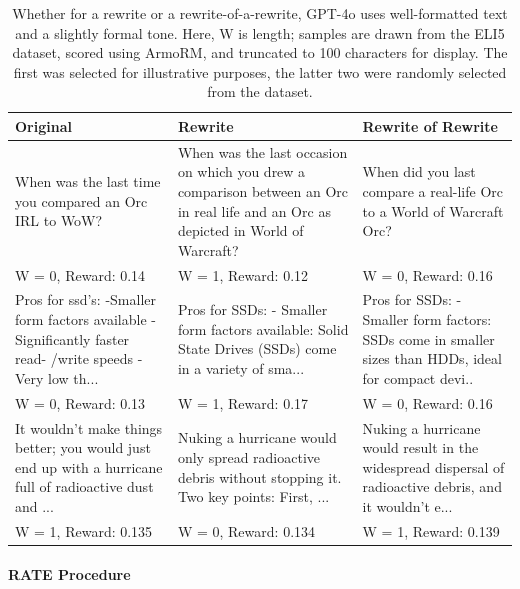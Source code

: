 \documentclass{article}
\begin{document}
\begin{table}[t]
  \centering
  \small
  \renewcommand{\arraystretch}{1.25}
  \begin{tabular}{|p{4cm}|p{4cm}|p{4cm}|}
  \hline
  \textbf{Original} & \textbf{Rewrite} & \textbf{Rewrite of Rewrite} \\
  \hline
  When was the last time you compared an Orc IRL to WoW? & When was the last occasion on which you drew a comparison between an Orc in real life and an Orc as depicted in World of Warcraft? & When did you last compare a real-life Orc to a World of Warcraft Orc? \\
  \hline
  W = 0, Reward: 0.14 & W = 1, Reward: 0.12 & W = 0, Reward: 0.16 \\
  \hline
  Pros for ssd’s: -Smaller
  form factors available -
  Signiﬁcantly faster read-
  /write speeds -Very low
  th... & Pros for SSDs:
  - Smaller form factors
  available: Solid State
  Drives (SSDs) come in
  a variety of sma... & Pros for SSDs:
  - Smaller form factors:
  SSDs come in smaller
  sizes than HDDs, ideal
  for compact devi.. \\
  \hline
  W = 0, Reward: 0.13 & W = 1, Reward: 0.17 & W = 0, Reward: 0.16 \\
  \hline
  It wouldn’t make things
  better; you would just
  end up with a hurricane
  full of radioactive dust
  and ... & Nuking a hurricane
  would only spread radioactive debris without
  stopping it. Two key
  points: First, ... & Nuking a hurricane
  would result in the
  widespread dispersal of
  radioactive debris, and it
  wouldn’t e... \\
  \hline
  W = 1, Reward: 0.135 & W = 0, Reward: 0.134 & W = 1, Reward: 0.139 \\
  \hline
  \end{tabular}
  \caption{Whether for a rewrite or a rewrite-of-a-rewrite, GPT-4o uses well-formatted text and a slightly formal tone. Here, W is length; samples are drawn from the ELI5 dataset, scored using ArmoRM, and truncated to 100 characters for display. The first was selected for illustrative purposes, the latter two were randomly selected from the dataset.}
  \label{tab:rewrites-rewrites}
\end{table}

\paragraph{RATE Procedure}
\end{document}
